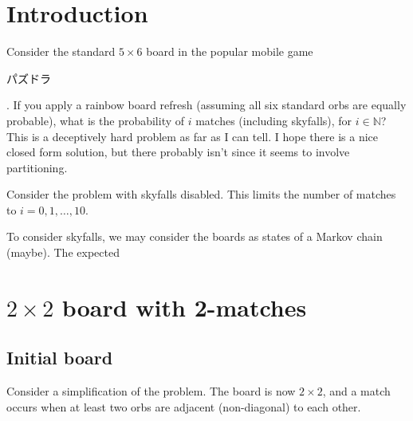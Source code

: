 \documentclass[12pt]{article}
\newcommand{\N}{\mathbb{N}}
\begin{document}
\tableofcontents
\section{Introduction}
Consider the standard $5\times 6$ board in the popular mobile game \begin{CJK}{UTF8}{min}パズドラ\end{CJK}. If you apply a rainbow board refresh (assuming all six standard orbs are equally probable), what is the probability of $i$ matches (including skyfalls), for $i\in\N$?
This is a deceptively hard problem as far as I can tell. I hope there is a nice closed form solution, but there probably isn't since it seems to involve partitioning.

Consider the problem with skyfalls disabled.
This limits the number of matches to $i=0,1,\dots,10$.

To consider skyfalls, we may consider the boards as states of a Markov chain (maybe). The expected 

\section{$2\times2$ board with 2-matches}
\subsection{Initial board}
Consider a simplification of the problem.
The board is now $2 \times 2$, and a match occurs when at least two orbs are adjacent (non-diagonal) to each other.
\end{document}
